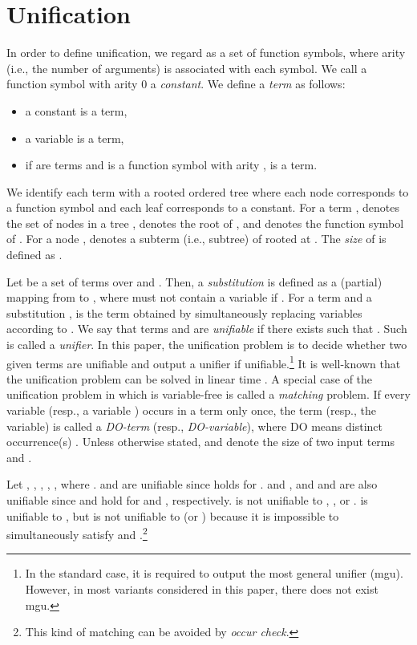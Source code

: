 \documentclass[a4paper]{llncs}
\begin{document}
\section{Unification}

In order to define unification,
we regard  as a set of function symbols, where 
arity (i.e., the number of arguments) is associated with each symbol.
We call a function symbol with arity 0 a \emph{constant}.
We define a \emph{term} as follows:
\begin{itemize}
\item a constant is a term,
\item a variable is a term,
\item if  are terms and
 is a function symbol with arity ,
 is a term.
\end{itemize}
We identify each term  with a rooted ordered tree where
each node corresponds to a function symbol and each leaf
corresponds to a constant.
For a term ,  denotes the set of nodes in a tree ,
 denotes the root of ,
and  denotes the function symbol of .
For a node ,  denotes a subterm (i.e., subtree)
of  rooted at .
The \emph{size} of  is defined as .

Let  be a set of terms over  and .
Then, a \emph{substitution}  is defined as 
a (partial) mapping from  to ,
where  must not contain a variable  if .
For a term  and a substitution ,
 is the term obtained by simultaneously replacing
variables according to .
We say that terms  and  are \emph{unifiable}
if there exists  such that .
Such  is called a \emph{unifier}.
In this paper, the unification problem is to decide
whether two given terms are unifiable and output a unifier
if unifiable.\footnote{In the standard case, it is required to
output the most general unifier (mgu). However, in most variants
considered in this paper, there does not exist mgu.}
It is well-known that the unification problem can be solved in
linear time \cite{paterson78}.
A special case of the unification problem in which  is
variable-free is called a \emph{matching} problem.
If every variable (resp., a variable ) occurs in a term  only once,
the term (resp., the variable) is called a \emph{DO-term} (resp.,
\emph{DO-variable}), where DO means distinct occurrence(s) \cite{benanav87}.
Unless otherwise stated,  and  denote the size of two input terms 
 and .


\begin{example}
Let ,
,
,
,
,
where .
 and  are unifiable since 
 holds for
.
 and , and  and  are also unifiable since 
 and
 hold for
 and
, respectively.
 is not unifiable to , , or .
 is unifiable to , but is not unifiable to
 (or ) because it is impossible to simultaneously satisfy
 and .\footnote{This kind of matching can be avoided by
\emph{occur check}.}
\end{example}
\end{document}
